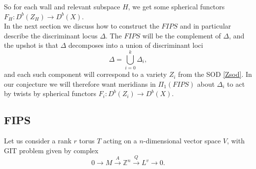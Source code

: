 \documentclass[oneside]{amsart}
\theoremstyle{definition}
\theoremstyle{definition}
\theoremstyle{definition}
\theoremstyle{definition}
\newcommand{\Z}{\mathbb{Z}}
\begin{document}
So for each wall and relevant subspace $H$, we get some spherical functors $F_H :D^b(Z_H) \to D^b(X)$.\\
\newline
In the next section we discuss how to construct the $FIPS$ and in particular describe the discriminant locus $\Delta$. The $FIPS$ will be the complement of $\Delta$, and the upshot is that $\Delta$ decomposes into a union of discriminant loci 
$$
\Delta = \bigcup_{i=0}^k \Delta_i,
$$
and each such component will correspond to a variety $Z_i$ from the SOD \eqref{Zsod}. In our conjecture we will therefore want meridians in $\Pi_1(FIPS)$ about $\Delta_i$ to act by twists by spherical functors $F_i :D^b(Z_i) \to D^b(X)$.

\subsection{FIPS}
\label{fips}
Let us consider a rank $r$ torus $T$ acting on a $n$-dimensional vector space $V$, with GIT problem given by complex
$$
0 \xrightarrow[]{} M \xrightarrow[]{A} \Z^n \xrightarrow[]{Q} L^v \xrightarrow[]{} 0.
$$ 
\end{document}
